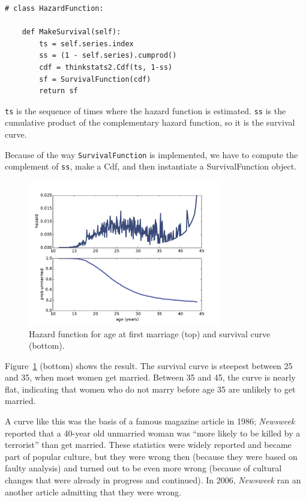 \documentclass[12pt]{book}
\begin{document}
\begin{verbatim}
# class HazardFunction:

    def MakeSurvival(self):
        ts = self.series.index
        ss = (1 - self.series).cumprod()
        cdf = thinkstats2.Cdf(ts, 1-ss)
        sf = SurvivalFunction(cdf)
        return sf
\end{verbatim}

{\tt ts} is the sequence of times where the hazard function is
estimated.  {\tt ss} is the cumulative product of the complementary
hazard function, so it is the survival curve.

Because of the way {\tt SurvivalFunction} is implemented, we have
to compute the complement of {\tt ss}, make a Cdf, and then instantiate
a SurvivalFunction object.


\begin{figure}
\centerline{\includegraphics[height=2.5in]{figs/survival2.pdf}}
\caption{Hazard function for age at first marriage (top) and
survival curve (bottom).}
\label{survival2}
\end{figure}

Figure~\ref{survival2} (bottom) shows the result.  The survival
curve is steepest between 25 and 35, when most women get married.
Between 35 and 45,
the curve is nearly flat, indicating that women who do not marry
before age 35 are unlikely to get married.

A curve like this was the basis of a famous magazine article in 1986;
{\it Newsweek} reported that a 40-year old unmarried woman was ``more
likely to be killed by a terrorist'' than get married.  These
statistics were widely reported and became part of popular culture,
but they were wrong then (because they were based on faulty analysis)
and turned out to be even more wrong (because of cultural changes that
were already in progress and continued).  In 2006, {\it Newsweek} ran
an another article admitting that they were wrong.
\end{document}
